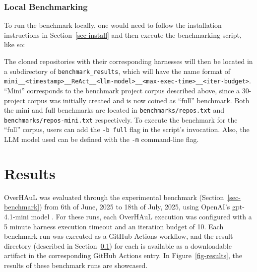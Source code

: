 \documentclass[
  a4paper,
  DIV=11,
  numbers=noendperiod]{scrreprt}
\newenvironment{Shaded}{\begin{snugshade}}{\end{snugshade}}
\newcommand{\NormalTok}[1]{\textcolor[rgb]{0.33,0.33,0.33}{#1}}
\theoremstyle{definition}
\theoremstyle{remark}
\begin{document}
\subsection{Local Benchmarking}\label{sec-local}

To run the benchmark locally, one would need to follow the installation
instructions in Section~\ref{sec-install} and then execute the
benchmarking script, like so:

\begin{Shaded}
\end{Shaded}

The cloned repositories with their corresponding harnesses will then be
located in a subdirectory of \texttt{benchmark\_results}, which will
have the name format of
\texttt{mini\_\_\textless{}timestamp\textgreater{}\_\_ReAct\_\_\textless{}llm-model\textgreater{}\_\_\textless{}max-exec-time\textgreater{}\_\_\textless{}iter-budget\textgreater{}}.
``Mini'' corresponds to the benchmark project corpus described above,
since a 30-project corpus was initially created and is now coined as
``full'' benchmark. Both the mini and full benchmarks are located in
\texttt{benchmarks/repos.txt} and \texttt{benchmarks/repos-mini.txt}
respectively. To execute the benchmark for the ``full'' corpus, users
can add the \texttt{-b\ full} flag in the script's invocation. Also, the
LLM model used can be defined with the \texttt{-m} command-line flag.


\chapter{Results}\label{results}

OverHAuL was evaluated through the experimental benchmark
(Section~\ref{sec-benchmark}) from 6th of June, 2025 to 18th of July,
2025, using OpenAI's gpt-4.1-mini model \autocite{openaidocs2025}. For
these runs, each OverHAuL execution was configured with a 5 minute
harness execution timeout and an iteration budget of 10. Each benchmark
run was executed as a GitHub Actions workflow, and the result directory
(described in Section~\ref{sec-local}) for each is available as a
downloadable artifact in the corresponding GitHub Actions entry. In
Figure~\ref{fig-results}, the results of these benchmark runs are
showcased.
\end{document}
